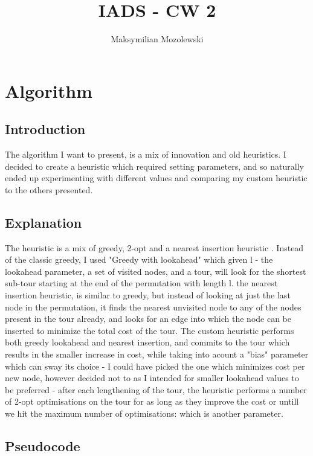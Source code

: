 \documentclass{report}
\begin{document}
\title{IADS - CW 2}
\author{Maksymilian Mozolewski}
\maketitle
\pagebreak
\section{Algorithm}
\subsection{Introduction}
The algorithm I want to present, is a mix of innovation and old heuristics. I decided to create a heuristic which required setting parameters, and so naturally ended up experimenting with different values and comparing my custom heuristic to the others presented.
\subsection{Explanation}
The heuristic is a mix of greedy, 2-opt and a nearest insertion heuristic \cite{nearest}. Instead of the classic greedy, I used "Greedy with lookahead" which given l - the lookahead parameter, a set of visited nodes, and a tour, will look for the shortest sub-tour starting at the end of the permutation with length l. the nearest insertion heuristic, is similar to greedy, but instead of looking at just the last node in the permutation, it finds the nearest unvisited node to any of the nodes present in the tour already, and looks for an edge into which the node can be inserted to minimize the total cost of the tour. The custom heuristic performs both greedy lookahead and nearest insertion, and commits to the tour which results in the smaller increase in cost, while taking into acount a "bias" parameter which can sway its choice - I could have picked the one which minimizes cost per new node, however decided not to as I intended for smaller lookahead values to be preferred - after each lengthening of the tour, the heuristic performs a number of 2-opt optimisations on the tour for as long as they improve the cost or untill we hit the maximum number of optimisations: which is another parameter.
\subsection{Pseudocode}
\end{document}
